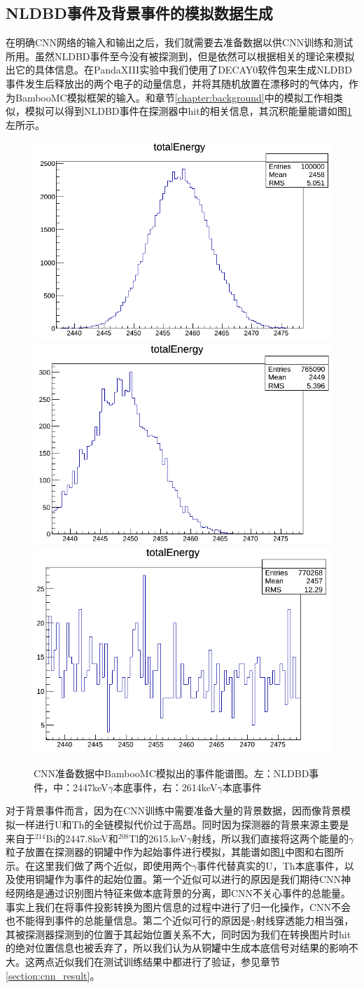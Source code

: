\subsection{NLDBD事件及背景事件的模拟数据生成}
\label{chapter:generate_nldbd}

在明确CNN网络的输入和输出之后，我们就需要去准备数据以供CNN训练和测试所用。虽然NLDBD事件至今没有被探测到，但是依然可以根据相关的理论来模拟出它的具体信息。在PandaXIII实验中我们使用了DECAY0软件包\supercite{ponkratenko2000event}来生成NLDBD事件发生后释放出的两个电子的动量信息，并将其随机放置在漂移时的气体内，作为BambooMC模拟框架的输入。和章节\ref{chapter:background}中的模拟工作相类似，模拟可以得到NLDBD事件在探测器中hit的相关信息，其沉积能量能谱如图\ref{fig:nldbd_energy}左所示。

\begin{figure}
    \centering
    \includegraphics[width=0.3\columnwidth]{pic/nldbd_raw_spectrum.png}
    \includegraphics[width=0.3\columnwidth]{pic/2447_raw_spectrum.png}
    \includegraphics[width=0.3\columnwidth]{pic/2614_raw_spectrum.png}
    \caption{CNN准备数据中BambooMC模拟出的事件能谱图。左：NLDBD事件，中：2447keV$\gamma$本底事件，右：2614keV$\gamma$本底事件}
    \label{fig:nldbd_energy}
\end{figure}

对于背景事件而言，因为在CNN训练中需要准备大量的背景数据，因而像背景模拟一样进行U和Th的全链模拟代价过于高昂。同时因为探测器的背景来源主要是来自于$^{214}$Bi的2447.8keV和$^{208}$Tl的2615.keV$\gamma$射线，所以我们直接将这两个能量的$\gamma$粒子放置在探测器的铜罐中作为起始事件进行模拟，其能谱如图\ref{fig:nldbd_energy}中图和右图所示。在这里我们做了两个近似，即使用两个$\gamma$事件代替真实的U，Th本底事件，以及使用铜罐作为事件的起始位置。第一个近似可以进行的原因是我们期待CNN神经网络是通过识别图片特征来做本底背景的分离，即CNN不关心事件的总能量。事实上我们在将事件投影转换为图片信息的过程中进行了归一化操作，CNN不会也不能得到事件的总能量信息。第二个近似可行的原因是$\gamma$射线穿透能力相当强，其被探测器探测到的位置于其起始位置关系不大，同时因为我们在转换图片时hit的绝对位置信息也被丢弃了，所以我们认为从铜罐中生成本底信号对结果的影响不大。这两点近似我们在测试训练结果中都进行了验证，参见章节\ref{section:cnn_result}。

